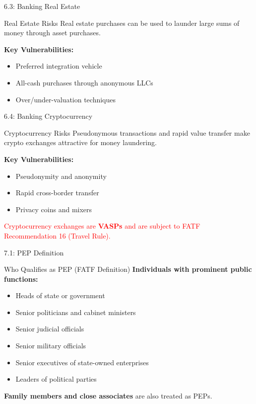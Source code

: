 \documentclass{beamer}
\begin{document}
	\begin{frame}{6.3: Banking Real Estate}
		\begin{block}{Real Estate Risks}
			Real estate purchases can be used to launder large sums of money through asset purchases.
		\end{block}
		\textbf{Key Vulnerabilities:}
		\begin{itemize}
			\item Preferred integration vehicle
			\item All-cash purchases through anonymous LLCs
			\item Over/under-valuation techniques
		\end{itemize}
	\end{frame}
	
	\begin{frame}{6.4: Banking Cryptocurrency}
		\begin{block}{Cryptocurrency Risks}
			Pseudonymous transactions and rapid value transfer make crypto exchanges attractive for money laundering.
		\end{block}
		\textbf{Key Vulnerabilities:}
		\begin{itemize}
			\item Pseudonymity and anonymity
			\item Rapid cross-border transfer
			\item Privacy coins and mixers
		\end{itemize}
		\textcolor{red}{Cryptocurrency exchanges are \textbf{VASPs} and are subject to FATF Recommendation 16 (Travel Rule).}
	\end{frame}
	
	
	\begin{frame}{7.1: PEP Definition}
		\begin{block}{Who Qualifies as PEP (FATF Definition)}
			\textbf{Individuals with prominent public functions:}
			\begin{itemize}
				\item Heads of state or government
				\item Senior politicians and cabinet ministers
				\item Senior judicial officials
				\item Senior military officials
				\item Senior executives of state-owned enterprises
				\item Leaders of political parties
			\end{itemize}
			\textbf{Family members and close associates} are also treated as PEPs.
		\end{block}
	\end{frame}
	
\end{document}
